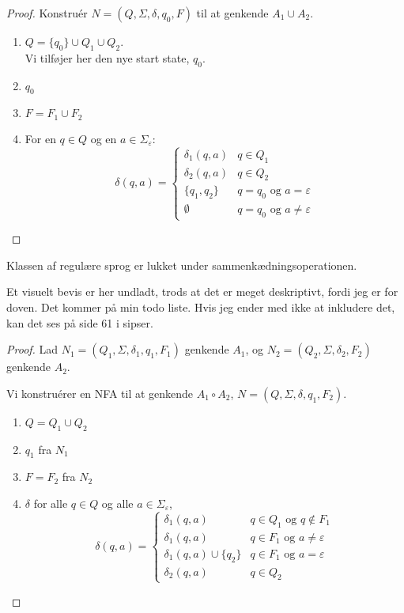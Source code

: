 \begin{proof}
Konstruér $N = (Q, \Sigma, \delta, q_{0}, F)$ til at genkende $A_1 \cup A_{2}$.
\begin{enumerate}
  \item $Q = \{q_{0}\} \cup Q_{1} \cup Q_{2}$.\\ Vi tilføjer her den nye start state, $q_{0}$.
  \item $q_{0}$
  \item $F = F_{1} \cup F_{2}$
  \item For en $q \in Q$ og en $a \in \Sigma_{\varepsilon}$:
        \begin{equation*}
\delta(q,a) = \begin{cases}
           \delta_{1}(q,a) & q \in Q_{1} \\
           \delta_{2}(q,a) & q \in Q_{2} \\
           \{q_{1}, q_{2}\} & q = q_{0} \text{ og } a = \varepsilon \\
           \emptyset & q = q_{0} \text{ og } a \neq \varepsilon
          \end{cases}
        \end{equation*}
\end{enumerate}

\end{proof}


\begin{theorem}
Klassen af regulære sprog er lukket under sammenkædningsoperationen.
\end{theorem}

Et visuelt bevis er her undladt, trods at det er meget deskriptivt, fordi jeg er for doven. Det kommer på min todo liste. Hvis jeg ender med ikke at inkludere det, kan det ses på side 61 i sipser.

\begin{proof}
  Lad $N_{1} =(Q_{1}, \Sigma, \delta_{1}, q_{1}, F_{1})$ genkende $A_{1}$, og $N_{2} = (Q_{2}, \Sigma, \delta_{2}, F_{2})$ genkende $A_{2}$.

  Vi konstruérer en NFA til at genkende $A_{1} \circ A_{2}$, $N = (Q, \Sigma, \delta, q_{1}, F_{2})$.
  \begin{enumerate}
    \item $Q = Q_{1} \cup Q_{2}$
    \item $q_{1}$ fra $N_{1}$
    \item $F = F_{2}$ fra $N_{2}$
    \item $\delta$ for alle $q \in Q$ og alle $a \in \Sigma_{\varepsilon}$,
          \begin{equation*}
\delta(q,a) = \begin{cases}
           \delta_{1}(q,a)& q \in Q_{1} \text{ og } q \notin F_{1}\\
           \delta_{1}(q,a)& q \in F_{1} \text{ og } a \neq \varepsilon \\

           \delta_{1}(q,a) \cup \{q_{2}\}& q \in F_{1} \text{ og } a = \varepsilon \\
           \delta_{2}(q,a) & q \in Q_{2}
         \end{cases}
          \end{equation*}
  \end{enumerate}
\end{proof}

